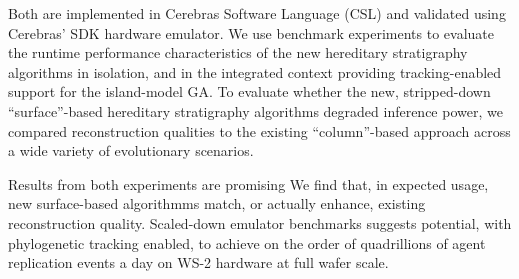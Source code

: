 Both are implemented in Cerebras Software Language (CSL) and validated using Cerebras' SDK hardware emulator.
We use benchmark experiments to evaluate the runtime performance characteristics of the new hereditary stratigraphy algorithms in isolation, and in the integrated context providing tracking-enabled support for the island-model GA.
To evaluate whether the new, stripped-down ``surface''-based hereditary stratigraphy algorithms degraded inference power, we compared reconstruction qualities to the existing ``column''-based approach across a wide variety of evolutionary scenarios.

Results from both experiments are promising
We find that, in expected usage, new surface-based algorithmms match, or actually enhance, existing reconstruction quality.
Scaled-down emulator benchmarks suggests potential, with phylogenetic tracking enabled, to achieve on the order of quadrillions of agent replication events a day on WS-2 hardware at full wafer scale.



